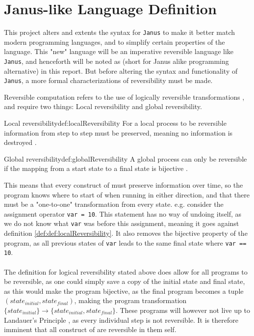\section{Janus-like Language Definition \rr} \label{sec:language-def}
This project alters and extents the syntax for \texttt{Janus} to make it better match modern
programming languages, and to simplify certain properties of the language.
This "new" language will be an imperative reversible language like
\texttt{Janus}, and henceforth will be noted as \lan
(short for Janus alike programming alternative) in this report.
But before altering the syntax and functionality of \texttt{Janus}, a more formal characterizations
of reversibility must be made.

Reversible computation refers to the use of logically reversible transformations \cite{ARTICLE:2},
and require two things: Local reversibility and global reversibility.

\begin{myDefinition}{Local reversibility}{def:localReversibility}
For a local process to be reversible information from step to step must be preserved, meaning no
information is destroyed \cite{ARTICLE:1}.
\end{myDefinition}

\begin{myDefinition}{Global reversibility}{def:globalReversibility}
A global process can only be reversible if the mapping from a start state to a final state is
bijective \cite{ARTICLE:1}. 
\end{myDefinition}
\noindent
This means that every construct of \lan must preserve information over time, so the program
knows where to start of when running in either direction, and that there must be a "one-to-one"
transformation from every state. e.g. consider the assignment operator \texttt{var = 10}. This
statement has no way of undoing itself, as we do not know what \texttt{var} was before this
assignment, meaning it goes against definition \ref{def:def:localReversibility}. It also removes
the bijective property of the program, as all previous states of \texttt{var} leads to the same
final state where \texttt{var == 10}.
\\
\\
The definition for logical reversibility stated above does allow for all programs to be reversible,
as one could simply save a copy of the initial state and final state, as this would make
the program bijective, as the final program becomes a tuple $(state_{initial}, state_{final})$,
making the program transformation $\{state_{initial}\} \to \{state_{initial}, state_{final}\}$.
These programs will however not live up to Landauer's Principle \cite{article:3}, as every
individual step is not reversible. It is therefore imminent that all construct of \lan are
reversible in them self.

